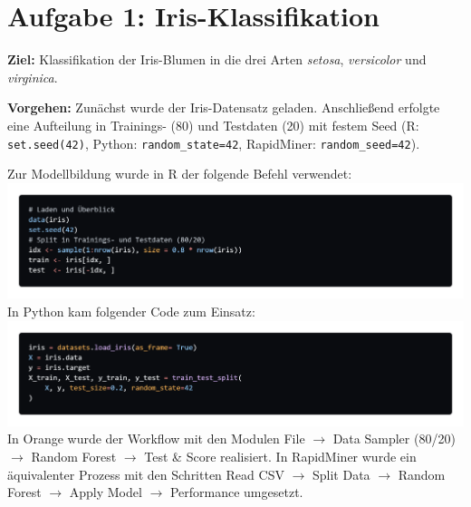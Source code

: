 \documentclass[a4paper,12pt]{scrartcl}
\begin{document}
\section*{Aufgabe 1: Iris-Klassifikation}

\textbf{Ziel:} Klassifikation der Iris-Blumen in die drei Arten \textit{setosa}, \textit{versicolor} und \textit{virginica}.\

\textbf{Vorgehen:} Zunächst wurde der Iris-Datensatz geladen. Anschließend erfolgte eine Aufteilung in Trainings- (80) und Testdaten (20) mit festem Seed (R: \lstinline|set.seed(42)|, Python: \lstinline|random_state=42|, RapidMiner: \lstinline|random_seed=42|).

Zur Modellbildung wurde in R der folgende Befehl verwendet:\\
\includegraphics[scale=0.25]{iris_1_R.png}\\

In Python kam folgender Code zum Einsatz:\\
\includegraphics[scale= 0.25]{iris_1_py.png}\\
In Orange wurde der Workflow mit den Modulen File $\to$ Data Sampler (80/20) $\to$ Random Forest $\to$ Test \& Score realisiert. In RapidMiner wurde ein äquivalenter Prozess mit den Schritten Read CSV $\to$ Split Data $\to$ Random Forest $\to$ Apply Model $\to$ Performance umgesetzt.
\end{document}

